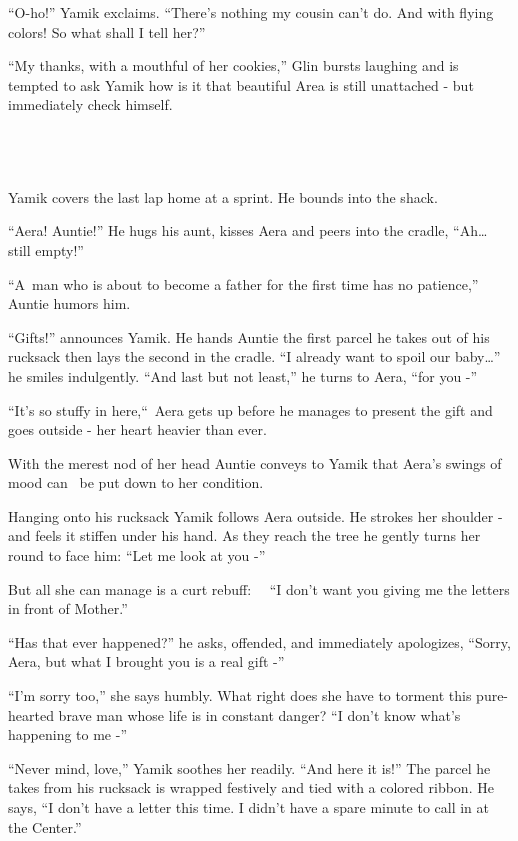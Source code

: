\documentclass[twoside,11pt]{book}
\begin{document}
``O-ho!'' Yamik exclaims. ``There's nothing my cousin can't do. And with flying
colors! So what shall I tell her?''

``My thanks, with a mouthful of her cookies,'' Glin bursts laughing and is tempted to ask
Yamik how is it that beautiful Area is still unattached - but immediately check himself.

~

\chapter{}

Yamik covers the last lap home at a sprint. He bounds into the shack.

``Aera! Auntie!'' He hugs his aunt, kisses Aera and peers into the cradle,
``Ah{\dots} still empty!''

``A~man who is about to become a father for the first time has no patience,'' Auntie humors
him.

``Gifts!'' announces Yamik. He hands Auntie the first parcel he takes out of his rucksack then
lays the second in the cradle. ``I already want to spoil our baby{\dots}'' he smiles indulgently. ``And
last but not least,'' he turns to Aera, ``for you -''

``It's so stuffy in here,``~Aera gets up before he manages to present the gift and goes
outside - her heart heavier than ever.

With the merest nod of her head Auntie conveys to Yamik that Aera's swings of mood can \ be put down to her condition.

Hanging onto his rucksack Yamik follows Aera outside. He strokes her shoulder - and feels it stiffen under his hand. As
they reach the tree he gently turns her round to face him: ``Let me look at you -''

But all she can manage is a curt rebuff: \ \ ``I don't want you giving me the letters in front of
Mother.''

``Has that ever happened?'' he asks, offended, and immediately apologizes,
``Sorry, Aera, but what I brought you is a real gift -''

``I'm sorry too,'' she says humbly. What right does she have to torment this pure-hearted
brave man whose life is in constant danger? ``I don't know what's happening to me -''

``Never mind, love,'' Yamik soothes her readily. ``And here it is!''
The parcel he takes from his rucksack is wrapped festively and tied with a colored ribbon. He says, ``I
don't have a letter this time. I didn't have a spare minute to call in at the Center.''
\end{document}
